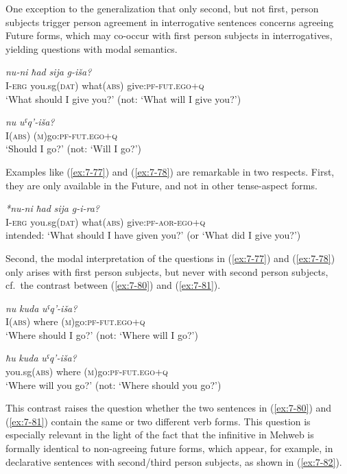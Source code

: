 ﻿\documentclass[output=paper]{langsci/langscibook}
\begin{document}
One exception to the generalization that only second, but not first,
person subjects trigger person agreement in interrogative sentences
concerns agreeing Future forms, which may co-occur with first person
subjects in interrogatives, yielding questions with modal semantics.

\ea \label{ex:7-77}
\gll \emph{nu-ni} \emph{ħad} \emph{sija} \emph{g-iša?}\\
I-\textsc{erg} you.sg(\textsc{dat}) what(\textsc{abs}) give:\textsc{pf}-\textsc{fut}.\textsc{ego}+\textsc{q}\\
\glt `What should I give you?' (not: `What will I give you?')

\ex \label{ex:7-78}
\gll \emph{nu} \emph{uˤq'-iša?}\\
I(\textsc{abs}) (\textsc{m})go:\textsc{pf}-\textsc{fut}.\textsc{ego}+\textsc{q}\\
\glt `Should I go?' (not: `Will I go?')
\z

Examples like (\ref{ex:7-77}) and (\ref{ex:7-78}) are remarkable in two respects. First, they
are only available in the Future, and not in other tense-aspect forms.

\ea %
\gll \emph{*nu-ni} \emph{ħad} \emph{sija} \emph{g-i-ra?}\\
I-\textsc{erg} you.sg(\textsc{dat}) what(\textsc{abs}) give:\textsc{pf}-\textsc{aor}-\textsc{ego}+\textsc{q}\\
\glt intended: `What should I have given you?' (or `What did I give you?')
\z

Second, the modal interpretation of the questions in (\ref{ex:7-77}) and (\ref{ex:7-78}) only
arises with first person subjects, but never with second person
subjects, cf.\ the contrast between (\ref{ex:7-80}) and (\ref{ex:7-81}).

\ea\label{ex:7-80}
\gll \emph{nu} \emph{kuda} \emph{uˤq'-iša?}\\
I(\textsc{abs}) where (\textsc{m})go:\textsc{pf}-\textsc{fut}.\textsc{ego}+\textsc{q}\\
\glt `Where should I go?' (not: `Where will I go?')

\ex\label{ex:7-81}
\gll \emph{ħu} \emph{kuda} \emph{uˤq'-iša?}\\
you.sg(\textsc{abs)} where (\textsc{m})go:\textsc{pf}-\textsc{fut}.\textsc{ego}+\textsc{q}\\
\glt `Where will you go?' (not: `Where should you go?')
\z

This contrast raises the question whether the two sentences in (\ref{ex:7-80}) and
(\ref{ex:7-81}) contain the same or two different verb forms. This question is
especially relevant in the light of the fact that the infinitive in
Mehweb is formally identical to non-agreeing future forms, which appear,
for example, in declarative sentences with second/third person subjects,
as shown in (\ref{ex:7-82}).
\end{document}

